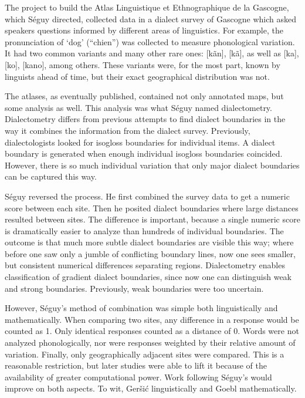 \documentclass[11pt]{article}
\begin{document}
The project to build the Atlas Linguistique et Ethnographique de la
Gascogne, which S\'eguy directed, collected data in a dialect survey
of Gascogne which asked speakers questions informed by different areas
of linguistics. For example, the pronunciation of `dog' (``chien'')
was collected to measure phonological variation. It had two common
variants and many other rare ones: [k\~an], [k\~a], as well as [ka],
[ko], [kano], among others. These variants were, for the most part,
known by linguists ahead of time, but their exact geographical
distribution was not.

The atlases, as eventually published, contained not only annotated
maps, but some analysis as well. This analysis was what S\'eguy named
dialectometry. Dialectometry differs from previous attempts to find
dialect boundaries in the way it combines the information from the
dialect survey. Previously, dialectologists looked for isogloss
boundaries for individual items. A dialect boundary is generated when
enough individual isogloss boundaries coincided. However, there is so
much individual variation that only major dialect boundaries can
be captured this way.

S\'eguy reversed the process. He first combined the survey data to get
a numeric score between each site. Then he posited dialect boundaries
where large distances resulted between sites. The difference is
important, because a single numeric score is dramatically easier to
analyze than hundreds of individual boundaries. The outcome is that
much more subtle dialect boundaries are visible this way; where before
one saw only a jumble of conflicting boundary lines, now one sees
smaller, but consistent numerical differences separating regions. {Dialectometry
  enables classification of gradient dialect boundaries, since now one
can distinguish weak and strong boundaries. Previously, weak
boundaries were too uncertain.}

However, S\'eguy's method of combination was simple both
linguistically and mathematically. When comparing two sites, any
difference in a response would be counted as 1. Only identical
responses counted as a distance of 0. Words were not analyzed
phonologically, nor were responses weighted by their relative amount
of variation. Finally, only geographically adjacent sites were
compared. This is a reasonable restriction, but later studies were
able to lift it because of the availability of greater computational
power. Work following S\'eguy's would improve on both aspects. To wit,
Ger\v{s}i\'c linguistically and Goebl mathematically.
\end{document}
